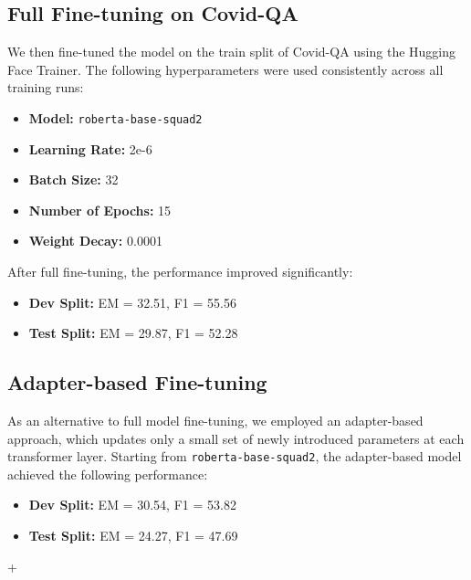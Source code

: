 \documentclass[11pt]{article}
\begin{document}
\subsection{Full Fine-tuning on Covid-QA}
We then fine-tuned the model on the train split of Covid-QA using the Hugging Face Trainer. The following hyperparameters were used consistently across all training runs:
\begin{itemize}
    \item \textbf{Model:} \texttt{roberta-base-squad2}
    \item \textbf{Learning Rate:} 2e-6
    \item \textbf{Batch Size:} 32
    \item \textbf{Number of Epochs:} 15
    \item \textbf{Weight Decay:} 0.0001
\end{itemize}
After full fine-tuning, the performance improved significantly:
\begin{itemize}
    \item \textbf{Dev Split:} EM = 32.51, F1 = 55.56
    \item \textbf{Test Split:} EM = 29.87, F1 = 52.28
\end{itemize}

\subsection{Adapter-based Fine-tuning}
As an alternative to full model fine-tuning, we employed an adapter-based approach, which updates only a small set of newly introduced parameters at each transformer layer. Starting from \texttt{roberta-base-squad2}, the adapter-based model achieved the following performance:
\begin{itemize}
    \item \textbf{Dev Split:} EM = 30.54, F1 = 53.82
    \item \textbf{Test Split:} EM = 24.27, F1 = 47.69
\end{itemize}

\begin{table}[t]
\centering
+%
\caption{Performance on the Covid-QA dataset under different adaptation strategies.}
\label{tab:covidqa}
\end{table}
\end{document}
